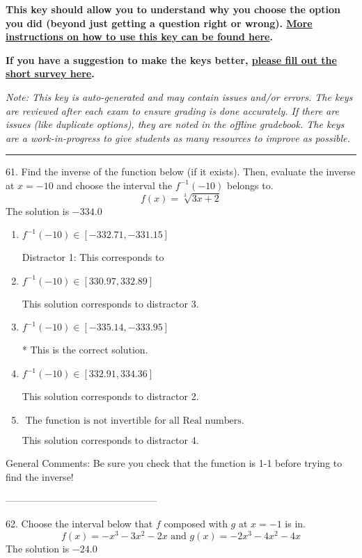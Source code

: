 \documentclass{article}[14pt]
\begin{document}
\textbf{This key should allow you to understand why you choose the option you did (beyond just getting a question right or wrong). \href{https://xronos.clas.ufl.edu/mac1105spring2020/courseDescriptionAndMisc/Exams/LearningFromResults}{More instructions on how to use this key can be found here}.}

\textbf{If you have a suggestion to make the keys better, \href{https://forms.gle/CZkbZmPbC9XALEE88}{please fill out the short survey here}.}

\textit{Note: This key is auto-generated and may contain issues and/or errors. The keys are reviewed after each exam to ensure grading is done accurately. If there are issues (like duplicate options), they are noted in the offline gradebook. The keys are a work-in-progress to give students as many resources to improve as possible.}

\rule{\textwidth}{0.4pt}

61. Find the inverse of the function below (if it exists). Then, evaluate the inverse at $x = -10$ and choose the interval the $f^{-1}(-10)$ belongs to.
$$ f(x) = \sqrt[3]{3 x + 2} $$ 
The solution is $ -334.0 $ 

\begin{enumerate}[label=\Alph*.] 
\item $ f^{-1}(-10) \in [-332.71, -331.15] $ 

  Distractor 1: This corresponds to  
\item $ f^{-1}(-10) \in [330.97, 332.89] $ 

  This solution corresponds to distractor 3. 
\item $ f^{-1}(-10) \in [-335.14, -333.95] $ 

 * This is the correct solution. 
\item $ f^{-1}(-10) \in [332.91, 334.36] $ 

  This solution corresponds to distractor 2. 
\item $ \text{ The function is not invertible for all Real numbers. } $ 

  This solution corresponds to distractor 4. 
\end{enumerate} 
 
General Comments: Be sure you check that the function is 1-1 before trying to find the inverse!

-----------------------------------------------

62. Choose the interval below that $f$ composed with $g$ at $x=-1$ is in.
$$ f(x) = -x^{3} -3 x^{2} -2 x \text{ and } g(x) = -2x^{3} -4 x^{2} -4 x $$ 
The solution is $ -24.0 $ 
\end{document}
